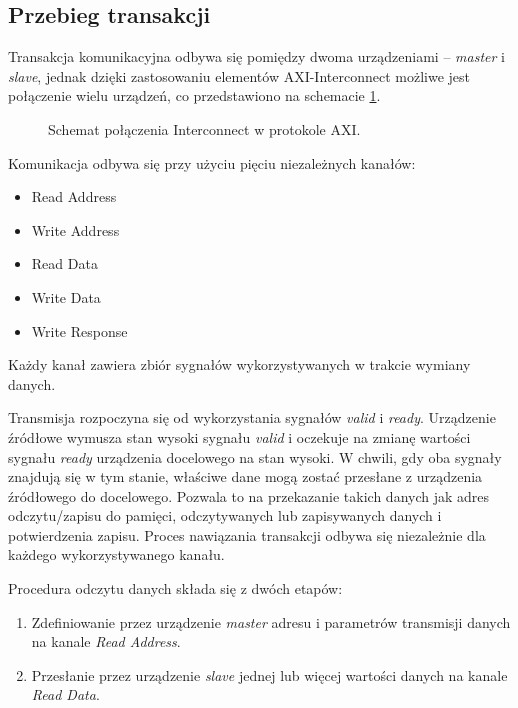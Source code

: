 \subsection{Przebieg transakcji}

Transakcja komunikacyjna odbywa się pomiędzy dwoma urządzeniami -- \emph{master} i \emph{slave}, jednak dzięki zastosowaniu elementów AXI-Interconnect możliwe jest połączenie wielu urządzeń, co przedstawiono na schemacie \ref{fig:axi-interconnect}.

\begin{figure}[h]
	\centering
	\def\svgwidth{8cm}
	
	\caption{Schemat połączenia Interconnect w protokole AXI.}
	\label{fig:axi-interconnect}
\end{figure}


Komunikacja odbywa się przy użyciu pięciu niezależnych kanałów:
\begin{itemize}
	\item Read Address
	\item Write Address
	\item Read Data
	\item Write Data
	\item Write Response
\end{itemize}

Każdy kanał zawiera zbiór sygnałów wykorzystywanych w trakcie wymiany danych.

Transmisja rozpoczyna się od wykorzystania sygnałów \emph{valid} i \emph{ready}. 
Urządzenie źródłowe wymusza stan wysoki sygnału \emph{valid} i oczekuje na zmianę wartości sygnału \emph{ready} urządzenia docelowego na stan wysoki. 
W chwili, gdy oba sygnały znajdują się w tym stanie, właściwe dane mogą zostać przesłane z urządzenia źródłowego do docelowego. 
Pozwala to na przekazanie takich danych jak adres odczytu/zapisu do pamięci, odczytywanych lub zapisywanych danych i potwierdzenia zapisu. 
Proces nawiązania transakcji odbywa się niezależnie dla każdego wykorzystywanego kanału.

Procedura odczytu danych składa się z dwóch etapów:
\begin{enumerate}
	\item Zdefiniowanie  przez urządzenie \emph{master} adresu i parametrów transmisji danych na kanale \emph{Read Address}.
	\item Przesłanie przez urządzenie \emph{slave} jednej lub więcej wartości danych na kanale \emph{Read Data}.
\end{enumerate}

